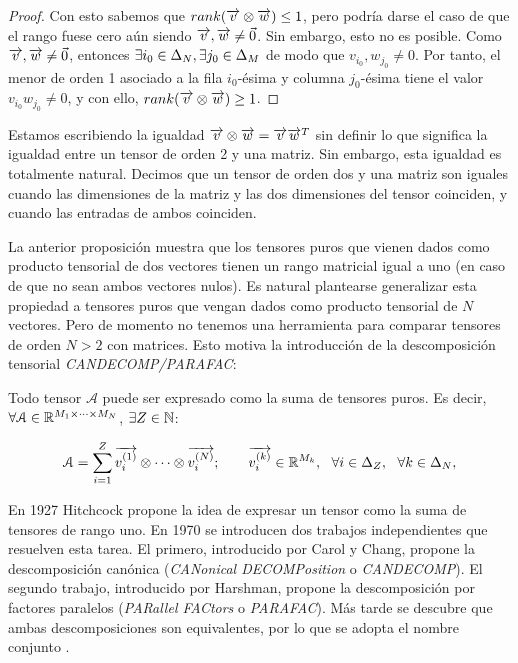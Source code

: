 \begin{proof}
	Con esto sabemos que $rank(\overrightarrow{v} \otimes \overrightarrow{w}) \leq 1$, pero podría darse el caso de que el rango fuese cero aún siendo $\overrightarrow{v}, \overrightarrow{w} \neq \vec{0}$. Sin embargo, esto no es posible. Como $\overrightarrow{v}, \overrightarrow{w} \neq \vec{0}$, entonces $\exists i_0 \in \Delta_{N}, \exists j_0 \in \Delta_{M}$ de modo que $v_{i_0}, w_{j_0} \neq 0$. Por tanto, el menor de orden 1 asociado a la fila $i_0$-ésima y columna $j_0$-ésima tiene el valor $v_{i_0} w_{j_0} \neq 0$, y con ello, $rank(\overrightarrow{v} \otimes \overrightarrow{w}) \geq 1$.

\end{proof}

\begin{observacion}
	Estamos escribiendo la igualdad $\overrightarrow{v} \otimes \overrightarrow{w} = \overrightarrow{v} \overrightarrow{w}^T$ sin definir lo que significa la igualdad entre un tensor de orden 2 y una matriz. Sin embargo, esta igualdad es totalmente natural. Decimos que un tensor de orden dos y una matriz son iguales cuando las dimensiones de la matriz y las dos dimensiones del tensor coinciden, y cuando las entradas de ambos coinciden.
\end{observacion}

La anterior proposición muestra que los tensores puros que vienen dados como producto tensorial de dos vectores tienen un rango matricial igual a uno (en caso de que no sean ambos vectores nulos). Es natural plantearse generalizar esta propiedad a tensores puros que vengan dados como producto tensorial de $N$ vectores. Pero de momento no tenemos una herramienta para comparar tensores de orden $N > 2$ con matrices. Esto motiva la introducción de la descomposición tensorial \textit{CANDECOMP/PARAFAC}:

\begin{proposicion} \label{proposicion:descomposicion_cp}
	Todo tensor $\mathcal{A}$ puede ser expresado como la suma de tensores puros. Es decir, $\forall \mathcal{A} \in \mathbb{R}^{M_1 \times \cdots \times M_N}$, $\exists Z \in \mathbb{N}$:

	\begin{equation} \label{eq:cp_decomp}
		\mathcal{A} = \sum_{i = 1}^Z \overrightarrow{v_i^{(1)}} \otimes \cdots \otimes \overrightarrow{v_i^{(N)}};
		\qquad \overrightarrow{v_i^{(k)}} \in \mathbb{R}^{M_k},
		\ \  \forall i \in \Delta_{Z},
		\ \  \forall k \in \Delta_{N},
	\end{equation}
\end{proposicion}

\begin{observacion}
	En 1927 Hitchcock propone la idea de expresar un tensor como la suma de tensores de rango uno. En 1970 se introducen dos trabajos independientes que resuelven esta tarea. El primero, introducido por Carol y Chang, propone la descomposición canónica (\textit{CANonical DECOMPosition} o \textit{CANDECOMP}). El segundo trabajo, introducido por Harshman, propone la descomposición por factores paralelos (\textit{PARallel FACtors} o \textit{PARAFAC}). Más tarde se descubre que ambas descomposiciones son equivalentes, por lo que se adopta el nombre conjunto \cite{matematicas:cp_nombre_paper}.
\end{observacion}

